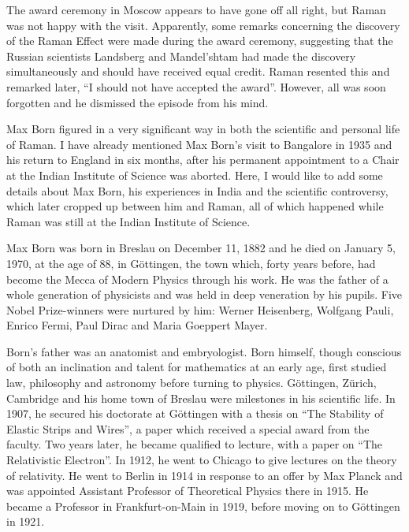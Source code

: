 The award ceremony in Moscow appears to have gone off all right, but Raman was not happy with the visit. Apparently, some remarks concerning the discovery of the Raman Effect were made during the award ceremony, suggesting that the Russian scientists Landsberg and Mandel'shtam had made the discovery simultaneously and should have received equal credit. Raman resented this and remarked later, ``I should not have accepted the award''. However, all was soon forgotten and he dismissed the episode from his mind.

\medskip
{}
\smallskip


\noindent
Max Born figured in a very significant way in both the scientific and personal life of Raman. I have already mentioned Max Born's visit to Bangalore in 1935 and his return to England in six months, after his permanent appointment to a Chair at the Indian Institute of Science was aborted. Here, I would like to add some details about Max Born, his experiences in India and the scientific controversy, which later cropped up between him and Raman, all of which happened while Raman was still at the Indian Institute of Science.

Max Born was born in Breslau on December 11, 1882 and he died on January 5, 1970, at the age of 88, in G\"ottingen, the town which, forty years before, had become the Mecca of Modern Physics through his work. He was the father of a whole generation of physicists and was held in deep veneration by his pupils. Five Nobel Prize-winners were nurtured by him: Werner Heisenberg, Wolfgang Pauli, Enrico Fermi, Paul Dirac and Maria Goeppert Mayer.

Born's father was an anatomist and embryologist. Born himself, though conscious of both an inclination and talent for mathematics at an early age, first studied law, philosophy and astronomy before turning to physics. G\"ottingen, Z\"urich, Cambridge and his home town of Breslau were milestones in his scientific life. In 1907, he secured his doctorate at G\"ottingen with a thesis on ``The Stability of Elastic Strips and Wires'', a paper which received a special award from the faculty. Two years later, he became qualified to lecture, with a paper on ``The Relativistic Electron''. In 1912, he went to Chicago to give lectures on the theory of relativity. He went to Berlin in 1914 in response to an offer by Max Planck and was appointed Assistant Professor of Theoretical Physics there in 1915. He became a Professor in Frankfurt-on-Main in 1919, before moving on to G\"ottingen in 1921.

